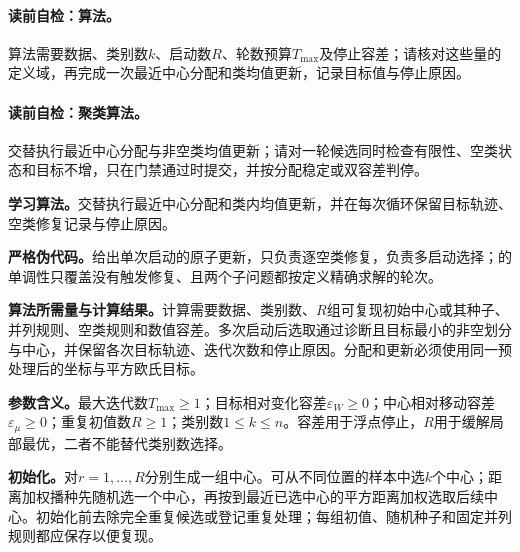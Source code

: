 \paragraph{读前自检：算法。}\kMeans{}算法需要数据、类别数$k$、启动数$R$、轮数预算$T_{\max}$及停止容差；请核对这些量的定义域，再完成一次最近中心分配和类均值更新，记录目标值与停止原因。\par
\paragraph{读前自检：\kMeans{}聚类算法。}\kMeans{}交替执行最近中心分配与非空类均值更新；请对一轮候选同时检查有限性、空类状态和目标不增，只在门禁通过时提交，并按分配稳定或双容差判停。\par

\label{struct:V4-C02-CH10}
\textbf{学习算法。}\kMeans{}交替执行最近中心分配和类内均值更新，并在每次循环保留目标轨迹、空类修复记录与停止原因。

\label{struct:V4-C02-CH19}
\textbf{严格伪代码。}给出单次启动的原子更新，只负责逐空类修复，负责多启动选择；的单调性只覆盖没有触发修复、且两个子问题都按定义精确求解的轮次。

\label{struct:V4-C02-CH20}
\textbf{算法所需量与计算结果。}计算需要数据、类别数、$R$组可复现初始中心或其种子、并列规则、空类规则和数值容差。多次启动后选取通过诊断且目标最小的非空划分与中心，并保留各次目标轨迹、迭代次数和停止原因。分配和更新必须使用同一预处理后的坐标与平方欧氏目标。

\label{struct:V4-C02-CH21}
\textbf{参数含义。}最大迭代数$T_{\max}\geq1$；目标相对变化容差$\varepsilon_W\geq0$；中心相对移动容差$\varepsilon_\mu\geq0$；重复初值数$R\geq1$；类别数$1\leq k\leq n$。容差用于浮点停止，$R$用于缓解局部最优，二者不能替代类别数选择。

\label{struct:V4-C02-CH22}
\textbf{初始化。}对$r=1,\ldots,R$分别生成一组中心。可从不同位置的样本中选$k$个中心；距离加权播种先随机选一个中心，再按到最近已选中心的平方距离加权选取后续中心。初始化前去除完全重复候选或登记重复处理；每组初值、随机种子和固定并列规则都应保存以便复现。

